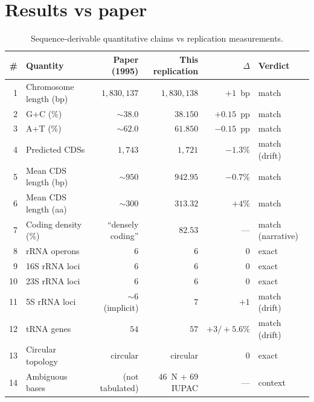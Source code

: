 \documentclass[10pt]{article}
\begin{document}
\section{Results vs paper}
\label{sec:results}

\begin{table}[htbp]
\centering
{\footnotesize
\begin{tabular}{@{}rlrrrl@{}}
\toprule
\textbf{\#} & \textbf{Quantity} & \textbf{Paper (1995)} & \textbf{This replication} & \textbf{$\Delta$} & \textbf{Verdict} \\
\midrule
1  & Chromosome length (bp)      & $1{,}830{,}137$ & $1{,}830{,}138$ & $+1$~bp     & match \\
2  & G+C (\%)                    & $\sim 38.0$     & $38.150$        & $+0.15$~pp   & match \\
3  & A+T (\%)                    & $\sim 62.0$     & $61.850$        & $-0.15$~pp   & match \\
4  & Predicted CDSs              & $1{,}743$       & $1{,}721$        & $-1.3\%$     & match (drift) \\
5  & Mean CDS length (bp)        & $\sim 950$      & $942.95$        & $-0.7\%$     & match \\
6  & Mean CDS length (aa)        & $\sim 300$      & $313.32$        & $+4\%$       & match \\
7  & Coding density (\%)         & ``densely coding'' & $82.53$      & ---          & match (narrative) \\
8  & rRNA operons                & $6$             & $6$              & $0$           & exact \\
9  & 16S rRNA loci               & $6$             & $6$              & $0$           & exact \\
10 & 23S rRNA loci               & $6$             & $6$              & $0$           & exact \\
11 & 5S rRNA loci                & $\sim 6$ (implicit) & $7$          & $+1$          & match (drift) \\
12 & tRNA genes                  & $54$            & $57$             & $+3 / +5.6\%$ & match (drift) \\
13 & Circular topology           & circular        & circular         & $0$           & exact \\
14 & Ambiguous bases             & (not tabulated) & $46$~N + $69$ IUPAC & ---       & context \\
\bottomrule
\end{tabular}}
\caption{Sequence-derivable quantitative claims vs replication measurements.}
\end{table}
\end{document}
